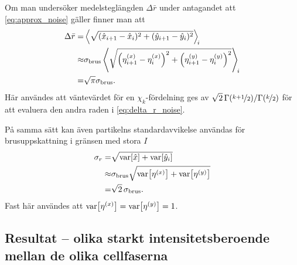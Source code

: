 Om man undersöker medelsteglängden $\Delta{\bar{r}}$ under antagandet att \eqref{eq:approx_noise} gäller finner man att
\begin{equation}\label{eq:delta_r_noise}
\begin{aligned}
\Delta{\bar{r}} =& 
\ev{\sqrt{ (\hat{x}_{i+1}-\hat{x}_{i})^2 + (\hat{y}_{i+1}-\hat{y}_{i})^2 } }_{\!i}
\\
\approx& 
\sigma_\text{brus} \ev{ \sqrt{ \left(\eta^{(x)}_{i+1} - \eta^{(x)}_{i}\right)^2 + \left(\eta^{(y)}_{i+1}-\eta^{(y)}_{i}\right)^2} }_{\!i} 
\\
=&\sqrt{\pi} \sigma_\text{brus}.
\end{aligned}
\end{equation}
Här användes att väntevärdet för en $\chi_k$-fördelning ges av
$\sqrt{2}\,\Gamma(\nicefrac{k+1}{2})/\Gamma(\nicefrac{k}{2})$ \cite{wiki:chi-distribution}
för att evaluera den andra raden i \eqref{eq:delta_r_noise}.\footnotemark{}

På samma sätt kan även partikelns standardavvikelse användas för brusuppskattning i gränsen med stora $I$
\begin{equation}\label{eq:sigma_r_noise}
\begin{aligned}
\sigma_r =& 
\sqrt{\text{var}\!\left[\hat{x}\right] + \text{var}\!\left[\hat{y}_{i}\right] }\\
\approx& \sigma_\text{brus} \sqrt{\text{var}\!\left[\eta^{(x)}\right] + \text{var}\!\left[\eta^{(y)}\right] }\\
=&\sqrt{2}\,\sigma_\text{brus}.
\end{aligned}
\end{equation}
Fast här användes att $\text{var}\!\left[\eta^{(x)}\right] = \text{var}\!\left[\eta^{(y)}\right] =1$.




\subsection{Resultat -- olika starkt intensitetsberoende mellan de olika cellfaserna}\label{sec:resultat-storleksberoende}

